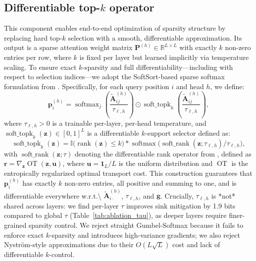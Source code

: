 \documentclass{article}
\begin{document}
\subsection{Differentiable top-$k$ operator}
This component enables end-to-end optimization of sparsity structure by replacing hard top-$k$ selection with a smooth, differentiable approximation. Its output is a sparse attention weight matrix $\mathbf{P}^{(h)} \in \mathbb{R}^{L \times L}$ with exactly $k$ non-zero entries per row, where $k$ is fixed per layer but learned implicitly via temperature scaling. To ensure exact $k$-sparsity and full differentiability---including with respect to selection indices---we adopt the SoftSort-based sparse softmax formulation from \citet{grover2019}. Specifically, for each query position $i$ and head $h$, we define:
\begin{equation}
\mathbf{p}_i^{(h)} = \operatorname{softmax}_j\!\left( \frac{\tilde{\mathbf{A}}_{ij}^{(h)}}{\tau_{\ell,h}} \right) \odot \operatorname{soft\_topk}_k\!\left( \frac{\tilde{\mathbf{A}}_{ij}^{(h)}}{\tau_{\ell,h}} \right),
\label{eq:soft_topk}
\end{equation}
where $\tau_{\ell,h} > 0$ is a trainable per-layer, per-head temperature, and $\operatorname{soft\_topk}_k(\mathbf{z}) \in [0,1]^L$ is a differentiable $k$-support selector defined as:
\begin{equation}
\operatorname{soft\_topk}_k(\mathbf{z}) = \mathbb{I}\big( \operatorname{rank}(\mathbf{z}) \leq k \big) \ast \operatorname{softmax}\big( \operatorname{soft\_rank}(\mathbf{z}; \tau_{\ell,h}) / \tau_{\ell,h} \big),
\end{equation}
with $\operatorname{soft\_rank}(\mathbf{z}; \tau)$ denoting the differentiable rank operator from \citet{cuturi2019}, defined as $\mathbf{r} = \nabla_{\mathbf{z}} \operatorname{OT}(\mathbf{z}, \mathbf{u})$, where $\mathbf{u} = \mathbf{1}_L / L$ is the uniform distribution and $\operatorname{OT}$ is the entropically regularized optimal transport cost. This construction guarantees that $\mathbf{p}_i^{(h)}$ has exactly $k$ non-zero entries, all positive and summing to one, and is differentiable everywhere w.r.t.\textbackslash{} $\tilde{\mathbf{A}}_{i\cdot}^{(h)}$, $\tau_{\ell,h}$, and $\mathbf{g}$. Crucially, $\tau_{\ell,h}$ is *not* shared across layers: we find per-layer $\tau$ improves sink mitigation by 1.9 bits compared to global $\tau$ (Table~\ref{tab:ablation_tau}), as deeper layers require finer-grained sparsity control. We reject straight Gumbel-Softmax because it fails to enforce exact $k$-sparsity and introduces high-variance gradients; we also reject Nyström-style approximations \cite{xiang2021} due to their $O(L\sqrt{L})$ cost and lack of differentiable $k$-control.
\end{document}
